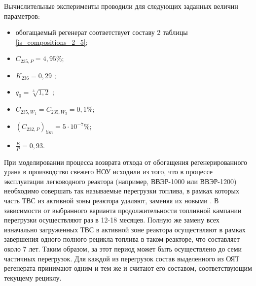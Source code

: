 Вычислительные эксперименты проводили для следующих заданных величин параметров: 

\begin{itemize}
    \item обогащаемый регенерат соответствует составу 2 таблицы \ref{is_compositions_2_5};
    \item $C_{235,{P}}=4,95\%$;
    \item $K_{236}=0,29$ \cite{smirnovEvolutionIsotopicComposition2012};
    \item $q_{0} = \sqrt[3]{1,2}$ \cite{smirnovEvolutionIsotopicComposition2012};
    \item $C_{235,{W_1}}=C_{235,{W_3}}=0,1\%$;
    \item ${(C_{232,P})}_{lim}=5\cdot10^{-7}\%$;
    \item $\frac{E}{P}=0,93$.
\end{itemize}

При моделировании процесса возврата отхода от обогащения регенерированного урана в производство свежего НОУ исходили из того, что в процессе эксплуатации легководного реактора (например, ВВЭР-1000 или ВВЭР-1200) необходимо совершать так называемые перегрузки топлива, в рамках которых часть ТВС из активной зоны реактора удаляют, заменяя их новыми \cite{острейковскийEkspluataciyaAtomnyhStanciy1999}. В зависимости от выбранного варианта продолжительности топливной кампании перегрузки осуществляют раз в 12-18 месяцев. Полную же замену всех изначально загруженных ТВС в активной зоне реактора осуществляют в рамках завершения одного полного рецикла топлива в таком реакторе, что составляет около 7 лет. Таким образом, за этот период может быть осуществлено до семи частичных перегрузок. Для каждой из перегрузок состав выделенного из ОЯТ регенерата принимают одним и тем же и считают его составом, соответствующим текущему рециклу.

